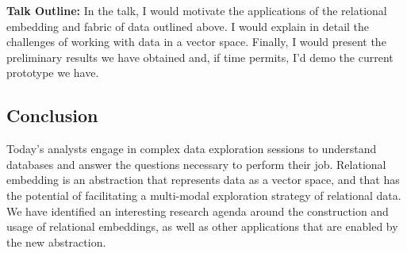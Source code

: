 \noindent\textbf{Talk Outline: }In the talk, I would motivate the applications of the
relational embedding and fabric of data outlined above. I would explain in
detail the challenges of working with data in a vector space. Finally, I would
present the preliminary results we have obtained and, if time permits, I'd demo
the current prototype we have.

\subsection*{Conclusion}

Today's analysts engage in complex data exploration sessions to understand
databases and answer the questions necessary to perform their job. Relational
embedding is an abstraction that represents data as a vector space, and that has
the potential of facilitating a multi-modal exploration strategy of relational
data. We have identified an interesting research agenda around the construction
and usage of relational embeddings, as well as other applications that are
enabled by the new abstraction.


